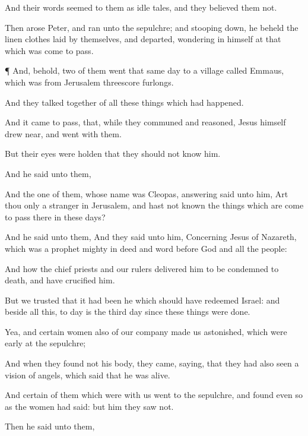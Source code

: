 {And
their
words
seemed
to
them
as idle
tales,
and they
believed
them
not.

Then
arose
Peter,
and
ran
unto the
sepulchre;
and stooping
down, he
beheld the linen
clothes
laid by
themselves,
and
departed,
wondering
in
himself at that
which was come to
pass.


\par }{\PP {}¶
And,
behold,
two
of
them
went
that
same
day
to a
village
called
Emmaus,
which
was
from
Jerusalem
{}
threescore
furlongs.

And
they
talked
together
of
all these
things
which had
happened.

And it came to
pass, that,
while
they
communed
{}
and
reasoned,
Jesus
himself drew
near, and
went with
them.

But
their
eyes were
holden that they
should
not
know
him.

And he
said
unto
them,
{}

And the one of
them,
whose
name was
Cleopas,
answering
said
unto
him,
Art
thou
only a
stranger
in
Jerusalem,
and
hast
not
known the things
which are come to
pass
there
in
these
days?

And he
said unto
them,
{}
And they
said unto
him,
Concerning
Jesus of
Nazareth,
which
was a
prophet
mighty
in
deed
and
word
before
God
and
all the
people:

And
how the chief
priests
and
our
rulers
delivered
him
to be
condemned to
death,
and have
crucified
him.

But
we
trusted
that it had
been
he
which
should have
redeemed
Israel:
and
beside
all
this, to
day
is the
third
day
since these
things were
done.

Yea,
and
certain
women also
of our
company
made
us
astonished, which
were
early
at the
sepulchre;

And when they
found
not
his
body, they
came, saying,
that they
had
also
seen a
vision of
angels,
which
said that
he was
alive.

And
certain of them which
were
with
us
went
to the
sepulchre,
and
found
{}
even
so
as the
women had
said:
but
him they
saw
not.

Then
he
said
unto
them,
{}

}
